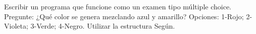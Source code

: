 ﻿
Escribir un programa que funcione como un examen tipo múltiple choice. Pregunte: ¿Qué color se genera mezclando azul y amarillo? Opciones: 1-Rojo; 2-Violeta; 3-Verde; 4-Negro. Utilizar la estructura Según.



\volverindice
\newpage
